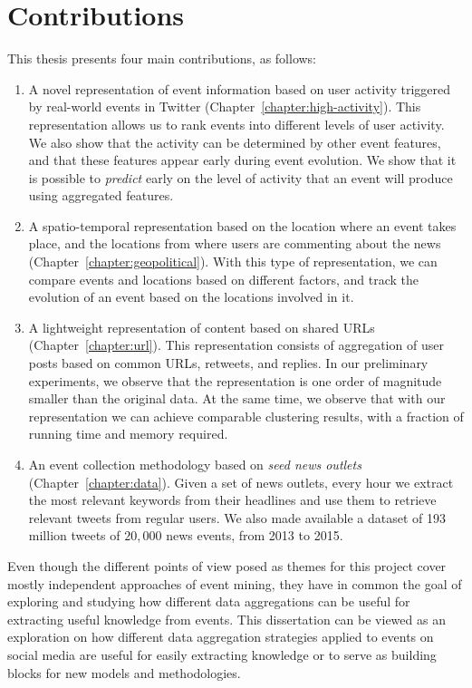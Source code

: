 \section{Contributions} 

This thesis presents four main contributions, as follows:

\begin{enumerate}
    \setlength\itemsep{0.5em}

\item A novel representation of event information based on user activity
triggered by real-world events in Twitter (Chapter~\ref{chapter:high-activity}).
%
This representation allows us to rank events into different levels of user
activity. 
%
We also show that the activity can be determined by other event features, and
that these features appear early during event evolution.
%
We show that it is possible to {\em predict} early on the level of activity that
an event will produce using aggregated features.

\item A spatio-temporal representation based on the location where an event
takes place, and the locations from where users are commenting about the news
(Chapter~\ref{chapter:geopolitical}).
%
With this type of representation, we can compare events and locations based on
different factors, and track the evolution of an event based on the locations
involved in it.

\item A lightweight representation of content based on shared URLs
(Chapter~\ref{chapter:url}).
%
This representation consists of aggregation of user posts based on common URLs,
retweets, and replies. 
%
In our preliminary experiments, we observe that the representation is one order
of magnitude smaller than the original data.
%
At the same time, we observe that with our representation we can achieve
comparable clustering results, with a fraction of running time and memory
required.

\item An event collection methodology based on {\em seed news outlets}
(Chapter~\ref{chapter:data}).
%
Given a set of news outlets, every hour we extract the most relevant keywords
from their headlines and use them to retrieve relevant tweets from regular
users.
%
We also made available a dataset of 193 million tweets of $20,000$ news events,
from 2013 to 2015.
\end{enumerate}

Even though the different points of view posed as themes for this project cover
mostly independent approaches of event mining, they have in common the goal of
exploring and studying how different data aggregations can be useful for
extracting useful knowledge from events. 
%
This dissertation can be viewed as an exploration on how different data
aggregation strategies applied to events on social media are useful for easily
extracting knowledge or to serve as building blocks for new models and
methodologies.


